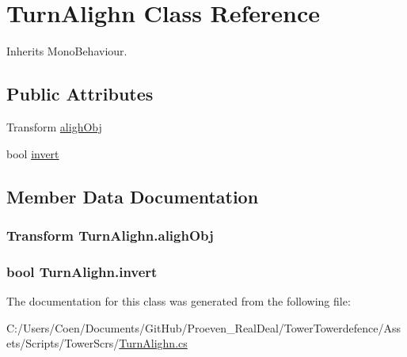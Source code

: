 \hypertarget{class_turn_alighn}{}\section{Turn\+Alighn Class Reference}
\label{class_turn_alighn}


Inherits Mono\+Behaviour.

\subsection*{Public Attributes}
\begin{DoxyCompactItemize}
\item 
Transform \hyperlink{class_turn_alighn_ab21da2396f9d2fda9c8174542bb81013}{aligh\+Obj}
\item 
bool \hyperlink{class_turn_alighn_ae0f81ee2ed864e13fc19d37e9a5106a1}{invert}
\end{DoxyCompactItemize}


\subsection{Member Data Documentation}
\subsubsection[{\texorpdfstring{aligh\+Obj}{alighObj}}]{\setlength{\rightskip}{0pt plus 5cm}Transform Turn\+Alighn.\+aligh\+Obj}\hypertarget{class_turn_alighn_ab21da2396f9d2fda9c8174542bb81013}{}\label{class_turn_alighn_ab21da2396f9d2fda9c8174542bb81013}
\subsubsection[{\texorpdfstring{invert}{invert}}]{\setlength{\rightskip}{0pt plus 5cm}bool Turn\+Alighn.\+invert}\hypertarget{class_turn_alighn_ae0f81ee2ed864e13fc19d37e9a5106a1}{}\label{class_turn_alighn_ae0f81ee2ed864e13fc19d37e9a5106a1}


The documentation for this class was generated from the following file\+:\begin{DoxyCompactItemize}
\item 
C\+:/\+Users/\+Coen/\+Documents/\+Git\+Hub/\+Proeven\+\_\+\+Real\+Deal/\+Tower\+Towerdefence/\+Assets/\+Scripts/\+Tower\+Scr\textquotesingle{}s/\hyperlink{_turn_alighn_8cs}{Turn\+Alighn.\+cs}\end{DoxyCompactItemize}
